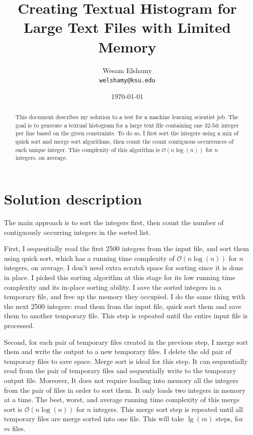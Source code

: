 \documentclass{article}
\author{Wesam Elshamy\\
       \texttt{welshamy@ksu.edu}}
\date{\today}
\title{Creating Textual Histogram for Large Text Files with Limited Memory}
\begin{document}
\maketitle
\begin{abstract}
This document describes my solution to a test for a machine learning scientist job.  The goal is to generate a textual histogram for a large text file containing one 32-bit integer per line based on the given constraints.  To do so, I first sort the integers using a mix of quick sort and merge sort algorithms, then count the count contiguous occurrences of each unique integer.  This complexity of this algorithm is $\mathcal{O}(n\log(n))$ for $n$ integers, on average.
\end{abstract}

\section{Solution description}
The main approach is to sort the integers first, then count the number of contiguously occurring integers in the sorted list.

First, I sequentially read the first 2500 integers from the input file, and sort them using quick sort, which has a running time complexity of $\mathcal{O}(n\log(n))$ for $n$ integers, on average.  I don't need extra scratch space for sorting since it is done in place.  I picked this sorting algorithm at this stage for its low running time complexity and its in-place sorting ability.  I save the sorted integers in a temporary file, and free up the memory they occupied.  I do the same thing with the next 2500 integers: read them from the input file, quick sort them and save them to another temporary file.  This step is repeated until the entire input file is processed.

Second, for each pair of temporary files created in the previous step, I merge sort them and write the output to a new temporary files.  I delete the old pair of temporary files to save space.  Merge sort is ideal for this step.  It can sequentially read from the pair of temporary files and sequentially write to the temporary output file.  Moreover, It does not require loading into memory all the integers from the pair of files in order to sort them.  It only loads two integers in memory at a time.  The best, worst, and average running time complexity of this merge sort is $\mathcal{O}(n\log(n))$ for $n$ integers.  This merge sort step is repeated until all temporary files are merge sorted into one file.  This will take $\lg(m)$ steps, for $m$ files.
\end{document}
